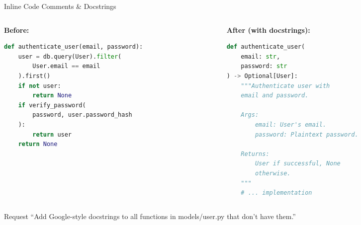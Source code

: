 \documentclass[aspectratio=169,11pt]{beamer}
\begin{document}
\begin{frame}[fragile]{Inline Code Comments \& Docstrings}
    \begin{columns}[T]
        \begin{column}{0.48\textwidth}
            \textbf{Before:}
            \begin{lstlisting}[language=python, basicstyle=\ttfamily\tiny]
def authenticate_user(email, password):
    user = db.query(User).filter(
        User.email == email
    ).first()
    if not user:
        return None
    if verify_password(
        password, user.password_hash
    ):
        return user
    return None
            \end{lstlisting}
        \end{column}
        \begin{column}{0.48\textwidth}
            \textbf{After (with docstrings):}
            \begin{lstlisting}[language=python, basicstyle=\ttfamily\tiny]
def authenticate_user(
    email: str,
    password: str
) -> Optional[User]:
    """Authenticate user with
    email and password.

    Args:
        email: User's email.
        password: Plaintext password.

    Returns:
        User if successful, None
        otherwise.
    """
    # ... implementation
            \end{lstlisting}
        \end{column}
    \end{columns}

    \vspace{0.2cm}
    \begin{exampleblock}{Request}
        ``Add Google-style docstrings to all functions in models/user.py that don't have them.''
    \end{exampleblock}

\end{frame}
\end{document}

